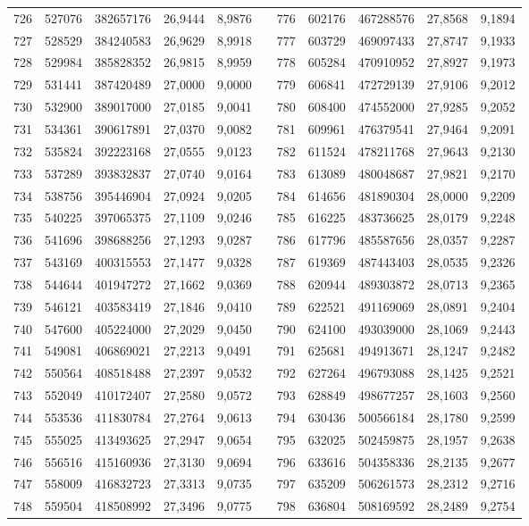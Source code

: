 \begin{longtable}{rrrrrrrrrrr}
726&527076&382657176&26,9444&8,9876&&776&602176&467288576&27,8568&9,1894\\
727&528529&384240583&26,9629&8,9918&&777&603729&469097433&27,8747&9,1933\\
728&529984&385828352&26,9815&8,9959&&778&605284&470910952&27,8927&9,1973\\
729&531441&387420489&27,0000&9,0000&&779&606841&472729139&27,9106&9,2012\\
730&532900&389017000&27,0185&9,0041&&780&608400&474552000&27,9285&9,2052\\
731&534361&390617891&27,0370&9,0082&&781&609961&476379541&27,9464&9,2091\\
732&535824&392223168&27,0555&9,0123&&782&611524&478211768&27,9643&9,2130\\
733&537289&393832837&27,0740&9,0164&&783&613089&480048687&27,9821&9,2170\\
734&538756&395446904&27,0924&9,0205&&784&614656&481890304&28,0000&9,2209\\
735&540225&397065375&27,1109&9,0246&&785&616225&483736625&28,0179&9,2248\\
736&541696&398688256&27,1293&9,0287&&786&617796&485587656&28,0357&9,2287\\
737&543169&400315553&27,1477&9,0328&&787&619369&487443403&28,0535&9,2326\\
738&544644&401947272&27,1662&9,0369&&788&620944&489303872&28,0713&9,2365\\
739&546121&403583419&27,1846&9,0410&&789&622521&491169069&28,0891&9,2404\\
740&547600&405224000&27,2029&9,0450&&790&624100&493039000&28,1069&9,2443\\
741&549081&406869021&27,2213&9,0491&&791&625681&494913671&28,1247&9,2482\\
742&550564&408518488&27,2397&9,0532&&792&627264&496793088&28,1425&9,2521\\
743&552049&410172407&27,2580&9,0572&&793&628849&498677257&28,1603&9,2560\\
744&553536&411830784&27,2764&9,0613&&794&630436&500566184&28,1780&9,2599\\
745&555025&413493625&27,2947&9,0654&&795&632025&502459875&28,1957&9,2638\\
746&556516&415160936&27,3130&9,0694&&796&633616&504358336&28,2135&9,2677\\
747&558009&416832723&27,3313&9,0735&&797&635209&506261573&28,2312&9,2716\\
748&559504&418508992&27,3496&9,0775&&798&636804&508169592&28,2489&9,2754\\

\end{longtable}
